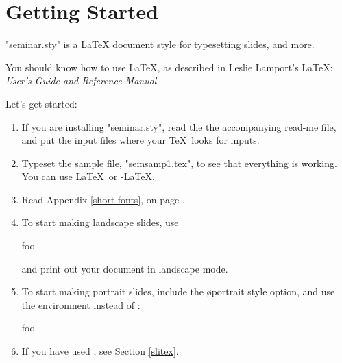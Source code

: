 \vfill

\twosideclearpage
{}
\tableofcontents

\twosideclearpage

\section*{Getting Started}

"seminar.sty" is a \LaTeX{} document style for typesetting slides, and more.

You should know how to use \LaTeX, as described in Leslie Lamport's \LaTeX:
{\em User's Guide and Reference Manual}.

Let's get started:
\begin{enumerate}
\item If you are installing "seminar.sty", read the the accompanying read-me
file, and put the input files where your \TeX\ looks for inputs.

\item Typeset the sample file, "semsamp1.tex", to see that everything is
working. You can use \LaTeX\ or \AmS-\LaTeX.

\item Read Appendix \ref{short-fonts}, on page \pageref{short-fonts}.

\item To start making landscape slides, use
\begin{LVerbatim}
  
  \begin{slide}
    foo
  \end{slide}
  
\end{LVerbatim}
and print out your document in landscape mode.

\item To start making portrait slides, include the \o{portrait} style option,
and use the  environment instead of :
\begin{LVerbatim}
  
  \begin{slide*}
    foo
  \end{slide*}
  
\end{LVerbatim}

\item If you have used \SliTeX, see Section \ref{slitex}.


\end{enumerate}
